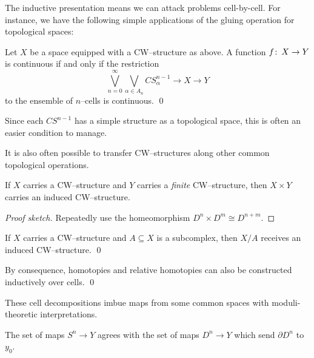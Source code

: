 The inductive presentation means we can attack problems cell-by-cell.
For instance, we have the following simple applications of the gluing operation for topological spaces:
\begin{corollary}
Let $X$ be a space equipped with a CW--structure as above.
A function $f\colon\thinspace X \to Y$ is continuous if and only if the restriction \[\bigvee_{n=0}^\infty \bigvee_{\alpha \in A_n} CS^{n-1}_\alpha \to X \to Y\] to the ensemble of $n$--cells is continuous. \qed
\end{corollary}

\noindent
Since each $CS^{n-1}$ has a simple structure as a topological space, this is often an easier condition to manage.

It is also often possible to transfer CW--structures along other common topological operations.

\begin{lemma}
If $X$ carries a CW--structure and $Y$ carries a \emph{finite} CW--structure, then $X \times Y$ carries an induced CW--structure.
\end{lemma}
\begin{proof}[Proof sketch]
Repeatedly use the homeomorphism $D^n \times D^m \cong D^{n+m}$.
\end{proof}

\begin{lemma}
If $X$ carries a CW--structure and $A \subseteq X$ is a subcomplex, then $X/A$ receives an induced CW--structure. \qed
\end{lemma}

\begin{corollary}
By consequence, homotopies and relative homotopies can also be constructed inductively over cells. \qed
\end{corollary}

These cell decompositions imbue maps from some common spaces with moduli-theoretic interpretations.

\begin{example}
The set of maps $S^n \to Y$ agrees with the set of maps $D^n \to Y$ which send $\partial D^n$ to $y_0$.
\end{example}

